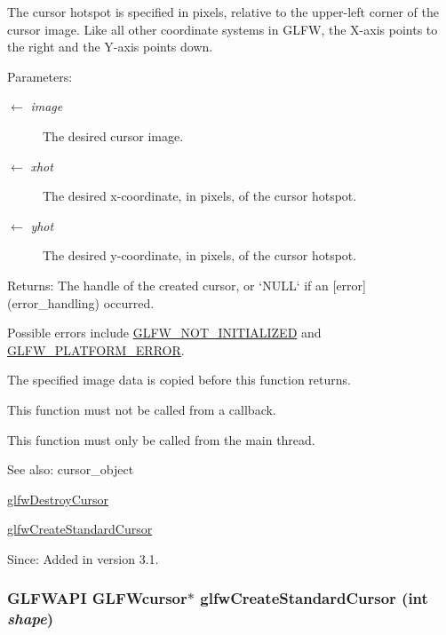 The cursor hotspot is specified in pixels, relative to the upper-left corner of the cursor image. Like all other coordinate systems in GLFW, the X-axis points to the right and the Y-axis points down.

\begin{Desc}
\item[Parameters:]
\begin{description}
\item[\mbox{$\leftarrow$} {\em image}]The desired cursor image. \item[\mbox{$\leftarrow$} {\em xhot}]The desired x-coordinate, in pixels, of the cursor hotspot. \item[\mbox{$\leftarrow$} {\em yhot}]The desired y-coordinate, in pixels, of the cursor hotspot. \end{description}
\end{Desc}
\begin{Desc}
\item[Returns:]The handle of the created cursor, or `NULL` if an \mbox{[}error\mbox{]}(error\_\-handling) occurred.\end{Desc}
Possible errors include \hyperlink{group__errors_g2374ee02c177f12e1fa76ff3ed15e14a}{GLFW\_\-NOT\_\-INITIALIZED} and \hyperlink{group__errors_gd44162d78100ea5e87cdd38426b8c7a1}{GLFW\_\-PLATFORM\_\-ERROR}.

The specified image data is copied before this function returns.

This function must not be called from a callback.

This function must only be called from the main thread.

\begin{Desc}
\item[See also:]cursor\_\-object 

\hyperlink{group__input_g27556b7122117bc1bbb4bb3cc003ea43}{glfwDestroyCursor} 

\hyperlink{group__input_g969dd87ad2ddbf3e1086cc40f235eed1}{glfwCreateStandardCursor}\end{Desc}
\begin{Desc}
\item[Since:]Added in version 3.1. \end{Desc}
\hypertarget{group__input_g969dd87ad2ddbf3e1086cc40f235eed1}{
\subsubsection[glfwCreateStandardCursor]{\setlength{\rightskip}{0pt plus 5cm}GLFWAPI {\bf GLFWcursor}$\ast$ glfwCreateStandardCursor (int {\em shape})}}
\label{group__input_g969dd87ad2ddbf3e1086cc40f235eed1}


